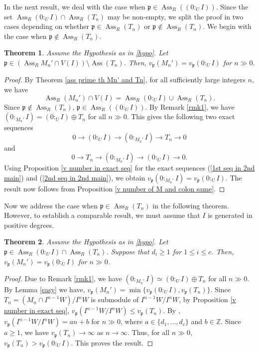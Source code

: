 \documentclass[11pt,reqno]{amsart}
\newtheorem{theorem}{Theorem}[section]
\theoremstyle{definition}
\newcommand{\p}{\mathfrak{p}}
\newcommand{\Z}{\mathbb{Z}}
\newcommand{\Ass}{\operatorname{Ass}}
\begin{document}
In the next result, we deal with the case when $\p\in \Ass_R ((0:_U I))$. Since the set $\Ass_R (0:_U I)\cap\Ass_R (T_n)$ may be non-empty, we split the proof in two cases depending on whether $\p\in \Ass_R(T_n)$ or $\p\notin \Ass_R(T_n)$. We begin with the case when $\p\notin \Ass_R(T_n)$.
\begin{theorem}\label{if p is not ass prime of Tn}
   Assume the Hypothesis as in \ref{hypo}. Let $\p\in  (\Ass_RM_n'\cap V(I))\setminus \Ass (T_n)$. Then, $v_{\p}(M_n')=v_{\p}(0:_UI)$ for $n\gg 0$.
\end{theorem}    
\begin{proof}
By Theorem \ref{ass prime th Mn' and Tn}, for all sufficiently large
integers $n$, we have
\[
\Ass_R(M_n')\cap V(I)
=
\Ass_R(0:_UI)\cup\Ass_R(T_n).
\]    
Since $\p\notin \Ass_R (T_n)$, $\p\in \Ass_R((0:_UI))$. By Remark \ref{rmk1}, we have $(0 :_{M_n'} I)=(0:_UI)\oplus T_n$ for all $n\gg0$. This gives the following two exact sequences
\begin{equation}\label{1st seq in 2nd main}
 0\to (0:_UI)\to (0 :_{M_n'} I)\to T_n\to 0   
\end{equation}
 and 
 \begin{equation}\label{2nd seq in 2nd main}
     0\to T_n\to (0 :_{M_n'} I)\to (0:_UI)\to 0.
 \end{equation}
 Using Proposition \ref{v number in exact seq} for the exact sequences (\ref{1st seq in 2nd main}) and (\ref{2nd seq in 2nd main}), we obtain $v_{\p}(0 :_{M_n'} I)=v_{\p}(0 :_U I).$ The result now follows from Proposition \ref{v number of M and colon same}.
\end{proof}
Now we address the case when $\p \in \Ass_R(T_n)$ in the following theorem. However, to establish a comparable result, we must assume that $I$ is generated in positive degrees.
\begin{theorem}\label{if p is ass prime of Tn}
     Assume the Hypothesis as in \ref{hypo}. Let $\p\in \Ass_R(0:_UI)\cap\Ass_R(T_n)$. Suppose that $d_i\geq 1$ for $1\leq i\leq c$. Then,  $v_{\p}(M_n')=v_{\p}(0:_UI)$ for $n\gg 0$.
\end{theorem}
\begin{proof}
Due to Remark \ref{rmk1}, we have $(0 :_{M_n'} I)\simeq(0:_UI)\oplus T_n$ for all $n\gg0$. By Lemma \ref{easy} we have, $v_{\p}(M_n')=\operatorname{min}\{v_{\p}(0:_UI), v_{\p}(T_n)\}.$ Since $T_n=(M_n\cap I^{n-1}W)/I^nW$ is submodule of $I^{n-1}W/I^nW$, by Proposition \ref{v number in exact seq}, $v_{\p}(I^{n-1}W/I^nW)\leq v_{\p}(T_n)$. By \cite[Theorem 2.11]{FG25}, $v_{\p}(I^{n-1}W/I^nW)=an+b$ for $n\gg 0$, where $a\in\{d_1,\ldots,d_c\}$ and $b\in \Z$. Since $a\geq 1$, we have $v_{\p}(T_n) \to \infty $ as $n\to \infty$. Thus, for all $n\gg 0$, $v_{\p}(T_n)>v_{\p}(0:_UI)$. This proves the result.
\end{proof}
\end{document}
